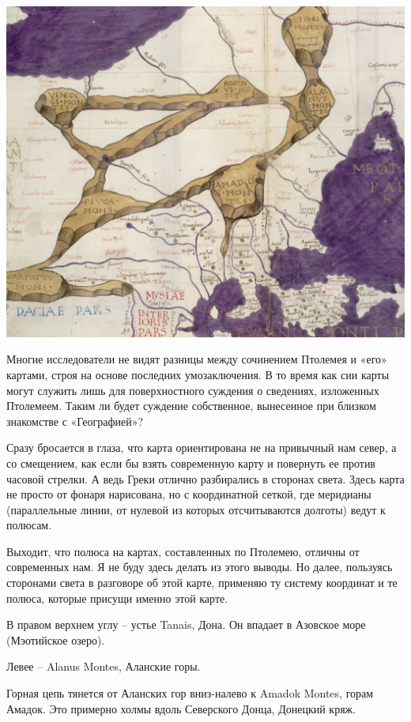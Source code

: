 \begin{center}
\includegraphics[width=\linewidth]{chast-colebanie-osnov/alani/ptol.jpg}
\end{center}

Многие исследователи не видят разницы между сочинением Птолемея и «его» картами, строя на основе последних умозаключения. В то время как сии карты могут служить лишь для поверхностного суждения о сведениях, изложенных Птолемеем. Таким ли будет суждение собственное, вынесенное при близком знакомстве с «Географией»?  

Сразу бросается в глаза, что карта ориентирована не на привычный нам север, а со смещением, как если бы взять современную карту и повернуть ее против часовой стрелки. А ведь Греки отлично разбирались в сторонах света. Здесь карта не просто от фонаря нарисована, но с координатной сеткой, где меридианы (параллельные линии, от нулевой из которых отсчитываются долготы) ведут к полюсам.

Выходит, что полюса на картах, составленных по Птолемею, отличны от современных нам. Я не буду здесь делать из этого выводы. Но далее, пользуясь сторонами света в разговоре об этой карте, применяю ту систему координат и те полюса, которые присущи именно этой карте.

В правом верхнем углу – устье Tanais, Дона. Он впадает в Азовское море (Мэотийское озеро).

Левее – Alanus Montes, Аланские горы. 

Горная цепь тянется от Аланских гор вниз-налево к Amadok Montes, горам Амадок. Это примерно холмы вдоль Северского Донца, Донецкий кряж.

